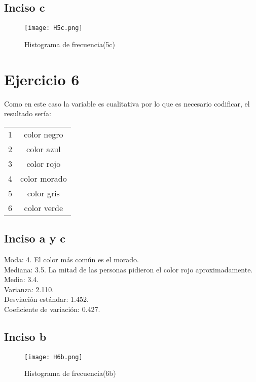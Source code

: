 \documentclass[a4paper,12pt]{article}
\begin{document}
\subsection*{Inciso c}
\begin{figure}[htb]%
	\begin{center}
		\texttt{[image: H5c.png]}
	\end{center}
	\caption{Histograma de frecuencia(5c)}
\end{figure}

\section*{Ejercicio 6}
Como en este caso la variable es cualitativa por lo que es necesario codificar, el resultado sería:\\
\begin{center}
	\begin{tabular}{cc}
		1 & color negro \\
		2 & color azul \\
		3 & color rojo \\
		4 & color morado \\
		5 & color gris \\
		6 & color verde \\
	\end{tabular}
\end{center}
\subsection*{Inciso a y c}
Moda: 4. El color más común es el morado.\\
Mediana: 3.5. La mitad de las personas pidieron el color rojo aproximadamente.\\
Media: 3.4.\\
Varianza: 2.110.\\
Desviación estándar: 1.452.\\
Coeficiente de variación: 0.427.
\subsection*{Inciso b}
\begin{figure}[htb]%
	\begin{center}
			\texttt{[image: H6b.png]}
	\end{center}
	\caption{Histograma de frecuencia(6b)}
\end{figure}
\end{document}
